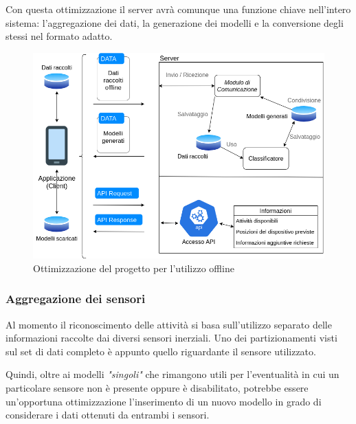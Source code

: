 \vspace{5mm} %
Con questa ottimizzazione il server avrà comunque una funzione chiave nell'intero sistema: l'aggregazione dei dati, la 
generazione dei modelli e la conversione degli stessi nel formato adatto.

\begin{figure}[H]
    \centering
    \includegraphics[scale = 0.56]{assets/images/future/offline.png}
    \caption{Ottimizzazione del progetto per l'utilizzo offline}
    \label{fig:future_overview}
\end{figure}

\subsubsection{Aggregazione dei sensori}
Al momento il riconoscimento delle attività si basa sull'utilizzo separato delle informazioni raccolte dai diversi sensori inerziali.
Uno dei partizionamenti visti sul set di dati completo è appunto quello riguardante il sensore utilizzato.

\vspace{5mm} %

Quindi, oltre ai modelli \textit{"singoli"} che rimangono utili per l'eventualità in cui un particolare sensore non è presente oppure è disabilitato, 
potrebbe essere un'opportuna ottimizzazione l'inserimento di un nuovo modello in grado di considerare i dati ottenuti da entrambi 
i sensori.